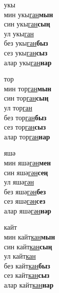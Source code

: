 \begin{multicols}{4}
\begin{enumerate}
\begin{minipage}{\linewidth}
    \item
    укы\\
    мин укы\underline{ган}\textbf{мын}\\
    син укы\underline{ган}\textbf{сың}\\
    ул укы\underline{ган}\\
    без укы\underline{ган}\textbf{быз}\\
    сез укы\underline{ган}\textbf{сыз}\\
    алар укы\underline{ган}\textbf{нар}\\
\end{minipage}

\begin{minipage}{\linewidth}
    \item
    тор\\
    мин тор\underline{ган}\textbf{мын}\\
    син тор\underline{ган}\textbf{сың}\\
    ул тор\underline{ган}\\
    без тор\underline{ган}\textbf{быз}\\
    сез тор\underline{ган}\textbf{сыз}\\
    алар тор\underline{ган}\textbf{нар}\\
\end{minipage}

\begin{minipage}{\linewidth}
    \item
    яшә\\
    мин яшә\underline{гән}\textbf{мен}\\
    син яшә\underline{гән}\textbf{сең}\\
    ул яшә\underline{гән}\\
    без яшә\underline{гән}\textbf{без}\\
    сез яшә\underline{гән}\textbf{сез}\\
    алар яшә\underline{гән}\textbf{нәр}\\
\end{minipage}

\begin{minipage}{\linewidth}
    \item
    кайт\\
    мин кайт\underline{кан}\textbf{мын}\\
    син кайт\underline{кан}\textbf{сың}\\
    ул кайт\underline{кан}\\
    без кайт\underline{кан}\textbf{быз}\\
    сез кайт\underline{кан}\textbf{сыз}\\
    алар кайт\underline{кан}\textbf{нар}\\
\end{minipage}


\end{enumerate}
\end{multicols}
